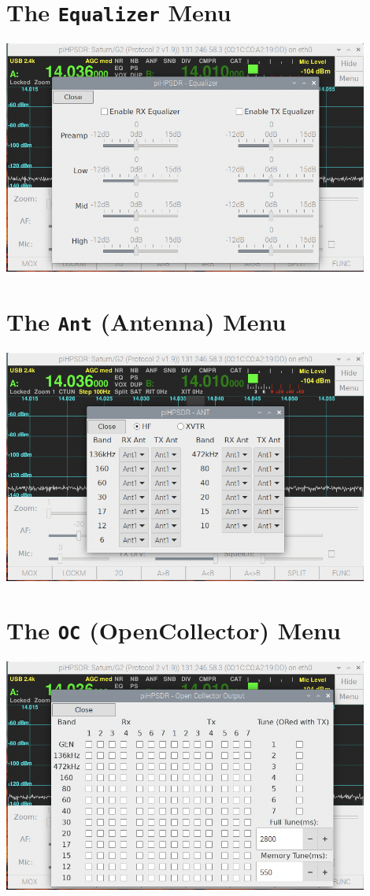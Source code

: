 \documentclass[12pt]{book}
\begin{document}
\section{The \texttt{Equalizer} Menu}
\begin{center}
\includegraphics[width=12cm]{EqualizerMenu.png}
\end{center}

\section{The \texttt{Ant} (Antenna) Menu}
\begin{center}
\includegraphics[width=12cm]{AntMenu.png}
\end{center}
 
\section{The \texttt{OC} (OpenCollector) Menu}
\begin{center}
\includegraphics[width=12cm]{OCMenu.png}
\end{center}
\end{document}
